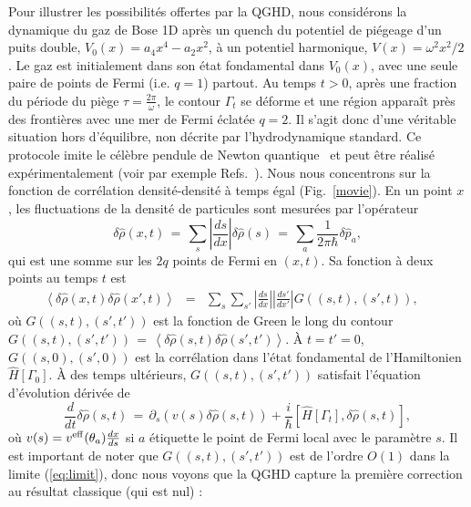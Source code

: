 \documentclass[twocolumn,amsfonts,showpacs,superscriptaddress]{revtex4-1}
\newcommand{\trad}[1]{\textcolor{myblue}{#1}}
\begin{document}
\trad{\vspace{0.1cm}
\noindent {\bf\em Un exemple et vérification numérique.}\; Pour illustrer les possibilités offertes par la QGHD, nous considérons la dynamique du gaz de Bose 1D après un quench du potentiel de piégeage d'un puits double, $V_0(x)= a_4 x^4 - a_2 x^2$, à un potentiel harmonique, $V(x) = \omega^2 x^2/2$. Le gaz est initialement dans son état fondamental dans $V_0(x)$, avec une seule paire de points de Fermi (i.e. $q=1$) partout. Au temps $t>0$, après une fraction du période du piège $\tau = \frac{2\pi}{\omega}$, le contour $\Gamma_t$ se déforme et une région apparaît près des frontières avec une mer de Fermi éclatée $q=2$. Il s'agit donc d'une véritable situation hors d'équilibre, non décrite par l'hydrodynamique standard. Ce protocole imite le célèbre pendule de Newton quantique~\cite{kinoshita2006quantum} et peut être réalisé expérimentalement (voir par exemple Refs.~\cite{schemmer2019generalized,joseph2011observation}).
Nous nous concentrons sur la fonction de corrélation densité-densité à temps égal (Fig.~\ref{movie}). En un point $x$, les fluctuations de la densité de particules sont mesurées par l'opérateur 
\begin{equation*}
	\delta \hat{\rho} (x,t) \, = \, \sum_s  \left| \frac{ds}{dx} \right| \delta \hat{\rho} (s) \, = \, \sum_{a}  \frac{1}{2\pi \hbar} \delta \hat{p}_a ,
\end{equation*}
qui est une somme sur les $2q$ points de Fermi en $(x,t)$. Sa fonction à deux points au temps $t$ est
\begin{eqnarray*} %
	\left< \delta \hat{\rho} (x,t) \delta \hat{\rho} (x',t) \right>  &=&  \sum_{s} \sum_{s'} \left| \frac{ds}{dx} \right|  \left| \frac{ds'}{dx'} \right| G((s,t),(s',t)) , \nonumber\quad
\end{eqnarray*}
où $ G((s,t),(s',t'))$ est la fonction de Green le long du contour $G((s,t) ,(s' ,t')) \, = \, \left< \delta \hat{\rho} (s,t) \delta \hat{\rho} (s',t') \right>$. À $t=t'=0$, $G((s,0),(s',0))$ est la corrélation dans l'état fondamental de l'Hamiltonien $\hat{H}[\Gamma_0]$. À des temps ultérieurs, $G((s,t),(s',t'))$ satisfait l'équation d'évolution dérivée de
\begin{equation*}
	\frac{d}{dt} \delta \hat{\rho} (s,t) \, = \, \partial_s (v(s) \delta \hat{\rho} (s,t)) + \frac{i}{\hbar} [ \hat{H} [\Gamma_t], \delta \hat{\rho}(s,t) ] ,
\end{equation*}
où $v(s) = v^{\rm eff} (\theta_a) \frac{dx}{ds}$ si $a$ étiquette le point de Fermi local avec le paramètre $s$. Il est important de noter que $G((s,t),(s',t'))$ est de l'ordre $O(1)$ dans la limite (\ref{eq:limit}), donc nous voyons que la QGHD capture la première correction au résultat classique (qui est nul) :
}
\end{document}
